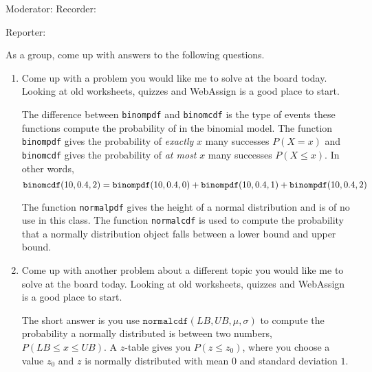 \documentclass{article}
\newcommand{\answer}[1]{\color{red}#1}
\begin{document}
{{\begin{enumerate}
\end{enumerate}



\begin{center}
\textbf{}
\end{center}

Moderator:{\underbar{\hspace{2in}}} \hfill  Recorder:{\underbar{\hspace{2in}}}

\bigskip

Reporter:{\underbar{\hspace{2in}}

As a group, come up with answers to the following questions.

\begin{enumerate} 

\item Come up with a problem you would like me to solve at the board today. Looking at old worksheets, quizzes and WebAssign is a good place to start.

{\answer The difference between \texttt{binompdf} and \texttt{binomcdf} is the type of events these functions compute the probability of in the binomial model. The function \texttt{binompdf} gives the probability of \textit{exactly} $x$ many successes $P(X=x)$ and \texttt{binomcdf} gives the probability of \textit{at most} $x$ many successes $P(X\leq x)$. In other words, 
$$\mbox{\texttt{binomcdf}}(10,0.4,2) = \mbox{\texttt{binompdf}}(10,0.4,0) + \mbox{\texttt{binompdf}}(10,0.4,1) + \mbox{\texttt{binompdf}}(10,0.4,2)$$

The function \texttt{normalpdf} gives the height of a normal distribution and is of no use in this class. The function \texttt{normalcdf} is used to compute the probability that a normally distribution object falls between a lower bound and upper bound.}

\item Come up with another problem about a different topic you would like me to solve at the board today. Looking at old worksheets, quizzes and WebAssign is a good place to start. 

{\answer The short answer is you use $\texttt{normalcdf}(LB, UB,\mu,\sigma)$ to compute the probability a normally distributed is between two numbers, $P(LB\leq x \leq UB)$. A $z$-table gives you $P(z\leq z_0)$, where you choose a value $z_0$ and $z$ is normally distributed with mean $0$ and standard deviation $1$.}
\end{enumerate}

}}}
\end{document}
